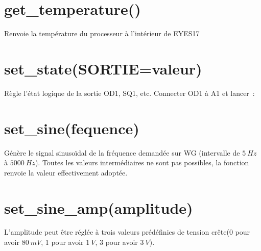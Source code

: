 \documentclass[a4paper,12pt,french]{sphinxmanual}
\begin{document}
\section{get\_temperature()}
\label{\detokenize{7.1:get-temperature}}
Renvoie la température du processeur à l’intérieur de EYES17

\begin{sphinxVerbatim}[commandchars=\\\{\}]
 
\end{sphinxVerbatim}


\section{set\_state(SORTIE=valeur)}
\label{\detokenize{7.1:set-state-sortie-valeur}}
Règle l’état logique de la sortie OD1, SQ1, etc. Connecter OD1 à A1
et lancer :

\begin{sphinxVerbatim}[commandchars=\\\{\}]
 
\end{sphinxVerbatim}


\section{set\_sine(fequence)}
\label{\detokenize{7.1:set-sine-fequence}}
Génère le signal sinusoïdal de la fréquence demandée sur WG (intervalle
de \(5~Hz\) à \(5000~Hz\)). Toutes les valeurs intermédiaires ne sont
pas possibles, la fonction renvoie la valeur effectivement adoptée.

\begin{sphinxVerbatim}[commandchars=\\\{\}]
 
\end{sphinxVerbatim}



\section{set\_sine\_amp(amplitude)}
\label{\detokenize{7.1:set-sine-amp-amplitude}}
L’amplitude peut être réglée à trois valeurs prédéfinies de tension
crête(0 pour avoir \(80~mV\), 1 pour avoir \(1~V\), 3 pour avoir \(3~V\)).
\end{document}
